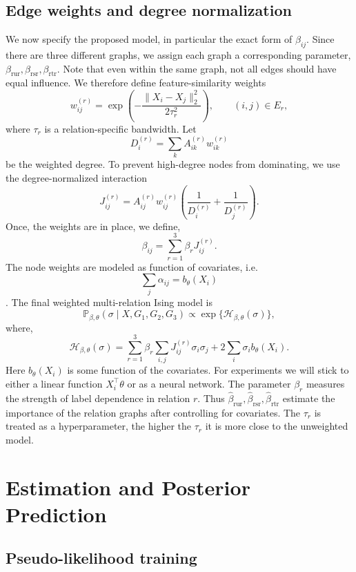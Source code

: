 \documentclass[twoside]{article}
\newcommand{\Pbb}{\mathbb P}
\begin{document}
\subsection{Edge weights and degree normalization}
We now specify the proposed model, in particular the exact form of $\beta_{ij}$. Since there are three different graphs, we assign each graph a corresponding parameter, $\beta_{\mathrm{rur}},\beta_{\mathrm{rsr}},\beta_{\mathrm{rtr}}$. Note that even within the same graph, not all edges should have equal influence. We therefore define feature-similarity weights
\[
    w_{ij}^{(r)} = \exp\left(-\frac{\|X_i-X_j\|_2^2}{2\tau_r^2}\right),\qquad (i,j)\in E_r,
\]
where $\tau_r$ is a relation-specific bandwidth. Let
\[
    D_i^{(r)} = \sum_k A_{ik}^{(r)}w_{ik}^{(r)}
\]
be the weighted degree. To prevent high-degree nodes from dominating, we use the degree-normalized interaction
\[
    J_{ij}^{(r)} = A_{ij}^{(r)}w_{ij}^{(r)}
    \left(\frac{1}{D_i^{(r)}}+\frac{1}{D_j^{(r)}}\right).
\]
Once, the weights are in place, we define,
$$\beta_{ij}=\sum_{r=1}^3 \beta_r J_{ij}^{(r)}.$$
The node weights are modeled as function of covariates, i.e.
$$\sum_j \alpha_{ij}=b_\theta(X_i)$$.
The final weighted multi-relation Ising model is
\begin{equation}
\label{eq:model}
\Pbb_{\beta,\theta}(\sigma\mid X,G_1,G_2,G_3)
    \propto \exp\{\mathcal H_{\beta,\theta}(\sigma)\},
\end{equation}
where,
\begin{equation*}
    \mathcal H_{\beta,\theta}(\sigma)= \sum_{r=1}^3 \beta_r\sum_{i,j}J_{ij}^{(r)}\sigma_i\sigma_j
    + 2\sum_i \sigma_i b_\theta(X_i).
\end{equation*}
Here $b_\theta(X_i)$ is some function of the covariates. For experiments we will stick to either a linear function $X_i^\top\theta$ or as a neural network. The parameter $\beta_r$ measures the strength of label dependence in relation $r$. Thus $\widehat\beta_{\mathrm{rur}},\widehat\beta_{\mathrm{rsr}},\widehat\beta_{\mathrm{rtr}}$ estimate the importance of the relation graphs after controlling for covariates. The $\tau_r$ is treated as a hyperparameter, the higher the $\tau_r$ it is more close to the unweighted model.

\section{Estimation and Posterior Prediction}

\subsection{Pseudo-likelihood training}
\end{document}
